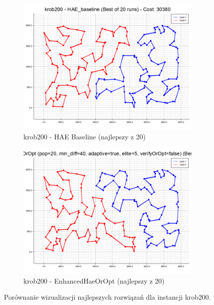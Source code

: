 \documentclass[12pt,a4paper]{article}
\begin{document}
\begin{figure}[H]
\begin{adjustwidth}{-1cm}{-1cm}
    \centering
    \begin{subfigure}[b]{0.49\textwidth}
        \centering
        \includegraphics[width=\textwidth]{output/lab7/krob200_HAE_baseline_best.png}
        \caption{krob200 - HAE Baseline (najlepszy z 20)}
        \label{fig:krob200_hae}
    \end{subfigure}
    \hfill
    \begin{subfigure}[b]{0.49\textwidth}
        \centering
        \includegraphics[width=\textwidth]{output/lab7/krob200_EnhancedHAEOrOpt_best.png}
        \caption{krob200 - EnhancedHaeOrOpt (najlepszy z 20)}
        \label{fig:krob200_enhanced}
    \end{subfigure}
    \caption{Porównanie wizualizacji najlepszych rozwiązań dla instancji krob200.}
    \label{fig:krob200_comparison}
\end{adjustwidth}
\end{figure}
\end{document}
